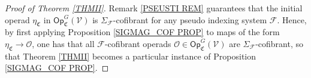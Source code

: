 \documentclass[a4paper,10pt
,draft
]{article}%
\numberwithin{equation}{section}
\numberwithin{figure}{section}
\theoremstyle{definition} %
\newtheorem{remark}[equation]{Remark}%
\newcommand{\sets}[2]{\left\{ #1 \;|\; #2\right\}}%
\newcommand{\vect}[1]{\text{\overrightharp{\ensuremath{#1}}}}
\DeclareMathOperator{\Aut}{Aut}%
\newcommand{\F}{\ensuremath{\mathcal F}}
\newcommand{\V}{\ensuremath{\mathcal V}}
\renewcommand{\O}{\ensuremath{\mathcal O}}
\newcommand{\1}{\ensuremath{\mathbbm 1}}%
\begin{document}
\begin{proof}[Proof of Theorem \ref{THMII}]
	Remark \ref{PSEUSTI REM}
	guarantees that the initial operad 
	$\eta_{\mathfrak{C}}$
	in $\mathsf{Op}^G_{\mathfrak{C}}(\V)$
	is $\Sigma_{\F}$-cofibrant for any
	pseudo indexing system $\F$.
	Hence, by first applying Proposition \ref{SIGMAG_COF PROP}
	to maps of the form $\eta_{\mathfrak{C}} \to \O$,
	one has that all $\F$-cofibrant operads
	$\O \in \mathsf{Op}^G_{\mathfrak{C}}(\V)$
	are $\Sigma_{\F}$-cofibrant,
	so that Theorem \ref{THMII} becomes a particular instance of 
	Proposition \ref{SIGMAG_COF PROP}.
\end{proof}



\end{document}
